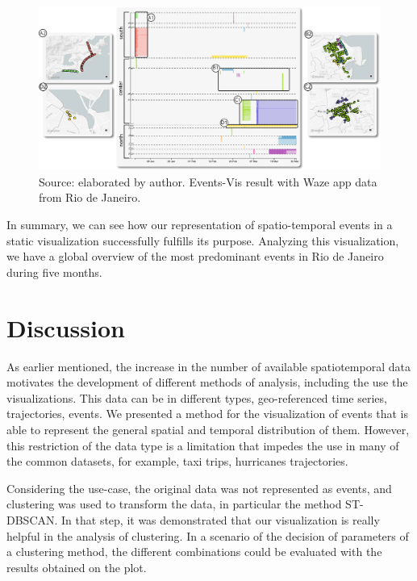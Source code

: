 \begin{figure}
    \centering
    \includegraphics[width = \linewidth]{src/imgs/waze-use-case.pdf}
    \caption{Source: elaborated by author. Events-Vis result with Waze app data from Rio de Janeiro.}
    \label{fig:waze-use-case}
\end{figure}

In summary, we can see how our representation of spatio-temporal events in a static visualization successfully fulfills its purpose. 
%
Analyzing this visualization, we have a global overview of the most predominant events in Rio de Janeiro during five months. 


\section{Discussion}

As earlier mentioned, the increase in the number of available spatiotemporal data motivates the development of different methods of analysis, including the use the visualizations.
%
This data can be in different types, geo-referenced time series, trajectories, events.
%
We presented a method for the visualization of events that is able to represent the general spatial and temporal distribution of them.
%
However, this restriction of the data type is a limitation that impedes the use in many of the common datasets, for example, taxi trips, hurricanes trajectories.

%
%
Considering the use-case, the original data was not represented as events, and clustering was used to transform the data, in particular the method ST-DBSCAN.
%
In that step, it was demonstrated that our visualization is really helpful in the analysis of clustering.
%
In a scenario of the decision of parameters of a clustering method, the different combinations could be evaluated with the results obtained on the plot.

